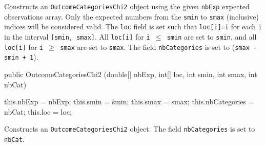 \begin{tabbb}  Constructs an \texttt{OutcomeCategoriesChi2} object using the
  given \texttt{nbExp} expected observations array.  Only the expected
  numbers from the \texttt{smin} to \texttt{smax} (inclusive) indices will be
  considered valid. The \texttt{loc} field is set such that \texttt{loc[i]=i}
  for each \texttt{i} in the interval \texttt{[smin, smax]}. All \texttt{loc[i]}
  for \texttt{i $\le$ smin} are set to \texttt{smin}, and all \texttt{loc[i]} for
  \texttt{i $\ge$ smax} are set to \texttt{smax}.
  The field \texttt{nbCategories} is set to (\texttt{smax - smin + 1}).
\end{tabbb}
\begin{htmlonly}
\end{htmlonly}
\begin{code}

      public OutcomeCategoriesChi2 (double[] nbExp, int[] loc,
                                    int smin, int smax, int nbCat)\begin{hide} {
         this.nbExp = nbExp;
         this.smin = smin;
         this.smax = smax;
         this.nbCategories = nbCat;
         this.loc = loc;
      }\end{hide}
\end{code}
   \begin{tabbb} Constructs an \texttt{OutcomeCategoriesChi2} object.
   The field \texttt{nbCategories} is set to  \texttt{nbCat}.
   \end{tabbb}
\begin{htmlonly}
\end{htmlonly}
